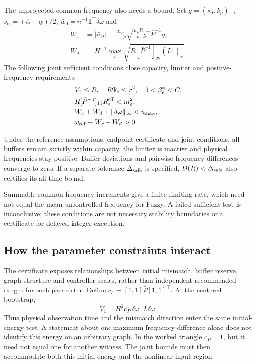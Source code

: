 The unprojected common frequency also needs a bound. Set
$g=(\kappa_I,k_p)^\top$,
$s_\alpha=(\overline\alpha-\underline\alpha)/2$,
$\bar w_0=n^{-1}\mathbf1^\top\delta\omega$ and
\begin{align}
 W_c&=|\bar w_0|+\frac{2s_\alpha}{1-\rho}
       \sqrt{\frac{\mu_nR}{n}g^\top\bar P^{-1}g},\nonumber\\
 W_d&=H^{-1}\max_i\sqrt{R[\bar P^{-1}]_{22}(L^\dagger)_{ii}}.
\end{align}
The following joint sufficient conditions close capacity, limiter
and positive-frequency requirements:
\begin{align}
 &V_1\le R,\quad R\Psi_i\le r^2,\quad 0<\beta_e^*<C,\nonumber\\
 &R[\bar P^{-1}]_{11}R_e^{\rm eff}<m_e^2,\nonumber\\
 &W_c+W_d+\|\delta\omega\|_\infty<u_{\max},\nonumber\\
 &\omega_{\rm ref}-W_c-W_d>0.
 \label{eq:btd_joint_sufficient_conditions}
\end{align}
\begin{btdcorollary}
\label{cor:btd_buffer_safety}
Under the reference assumptions, endpoint certificate and joint
conditions, all buffers remain strictly within capacity, the limiter
is inactive and physical frequencies stay positive. Buffer deviations
and pairwise frequency differences converge to zero. If a separate
tolerance $\Delta_{\rm safe}$ is specified, $D(R)<\Delta_{\rm safe}$
also certifies its all-time bound.
\end{btdcorollary}
Summable common-frequency increments give a finite limiting rate,
which need not equal the mean uncontrolled frequency for Fuzzy. A failed sufficient
test is inconclusive; these conditions are not necessary stability
boundaries or a certificate for delayed integer execution.

\subsection{How the parameter constraints interact}
The certificate exposes relationships between initial mismatch,
buffer reserve, graph structure and controller scales, rather than
independent recommended ranges for each parameter. Define
$c_P=[1,1]\bar P[1,1]^\top$. At the centered bootstrap,
\begin{equation}
 V_1=H^2c_P\,\delta\omega^\top L\delta\omega.
\end{equation}
Thus physical observation time and the mismatch direction enter the
same initial-energy test. A statement about one maximum frequency
difference alone does not identify this energy on an arbitrary graph.
In the worked triangle $c_P=1$, but it need not equal one for another
witness. The joint bounds must then accommodate both this initial
energy and the nonlinear input region.

